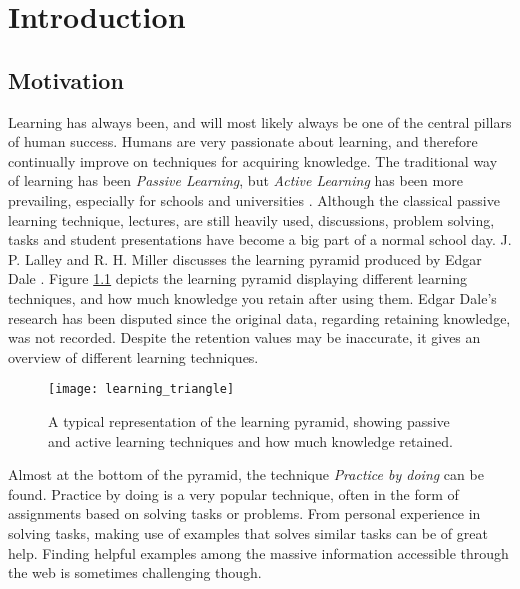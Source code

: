 
\chapter{Introduction} \label{cap_1}

\section{Motivation}

Learning has always been, and will most likely always be one of the central pillars of human success. Humans are very passionate about learning, and therefore continually improve on techniques for acquiring knowledge. The traditional way of learning has been \textit{Passive Learning}, but \textit{Active Learning} has been more prevailing, especially for schools and universities \cite{active-learning}. Although the classical passive learning technique, lectures, are still heavily used, discussions, problem solving, tasks and student presentations have become a big part of a normal school day. J. P. Lalley and R. H. Miller discusses the learning pyramid produced by Edgar Dale \cite{learning_pyramid}. Figure \ref{fig:lt} depicts the learning pyramid displaying different learning techniques, and how much knowledge you retain after using them. Edgar Dale's research has been disputed since the original data, regarding retaining knowledge, was not recorded. Despite the retention values may be inaccurate, it gives an overview of different learning techniques. 

\begin{figure}[h] 
\caption{A typical representation of the learning pyramid, showing passive and active learning techniques and how much knowledge retained.}
\texttt{[image: learning\_triangle]}
\label{fig:lt}
\end{figure}

Almost at the bottom of the pyramid, the technique \textit{Practice by doing} can be found. Practice by doing is a very popular technique, often in the form of assignments based on solving tasks or problems. From personal experience in solving tasks, making use of examples that solves similar tasks can be of great help. Finding helpful examples among the massive information accessible through the web is sometimes challenging though.

